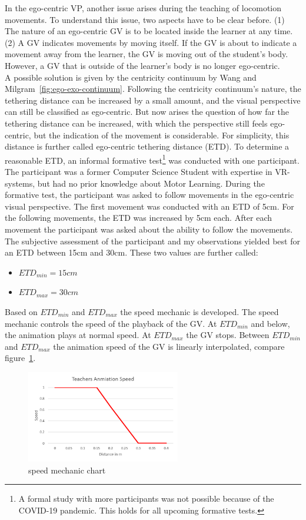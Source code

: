 In the ego-centric VP, another issue arises during the teaching of locomotion movements. To understand this issue, two aspects have to be clear before. (1) The nature of an ego-centric GV is to be located inside the learner at any time. (2) A GV indicates movements by moving itself. If the GV is about to indicate a movement away from the learner, the GV is moving out of the student's body. However, a GV that is outside of the learner's body is no longer ego-centric.\\
A possible solution is given by the centricity continuum by Wang and Milgram~\ref{fig:ego-exo-continuum}. Following the centricity continuum's nature, the tethering distance can be increased by a small amount, and the visual perspective can still be classified as ego-centric. But now arises the question of how far the tethering distance can be increased, with which the perspective still feels ego-centric, but the indication of the movement is considerable. For simplicity, this distance is further called ego-centric tethering distance (ETD). To determine a reasonable ETD, an informal formative test\footnote{A formal study with more participants was not possible because of the COVID-19 pandemic. This holds for all upcoming formative tests.} was conducted with one participant. The participant was a former Computer Science Student with expertise in VR-systems, but had no prior knowledge about Motor Learning. During the formative test, the participant was asked to follow movements in the ego-centric visual perspective. The first movement was conducted with an ETD of 5cm. For the following movements, the ETD was increased by 5cm each. After each movement the participant was asked about the ability to follow the movements. The subjective assessment of the participant and my observations yielded best for an ETD between 15cm and 30cm. These two values are further called:
\begin{itemize}
	\item[] $ETD_{min}=15cm$
	\item[] $ETD_{max}=30cm$
\end{itemize}
Based on $ETD_{min}$ and $ETD_{max}$ the speed mechanic is developed. The speed mechanic controls the speed of the playback of the GV. At $ETD_{min}$ and below, the animation plays at normal speed. At $ETD_{max}$ the GV stops. Between $ETD_{min}$ and $ETD_{max}$ the animation speed of the GV is linearly interpolated, compare figure~\ref{fig:speed_mechanic}.
\begin{figure}[htb]
	\centering
	\includegraphics[width=0.6\textwidth]{figures/speed_mechanic_chart.png}
	\caption[speed mechanic chart]{speed mechanic chart}
	\label{fig:speed_mechanic}
\end{figure}
